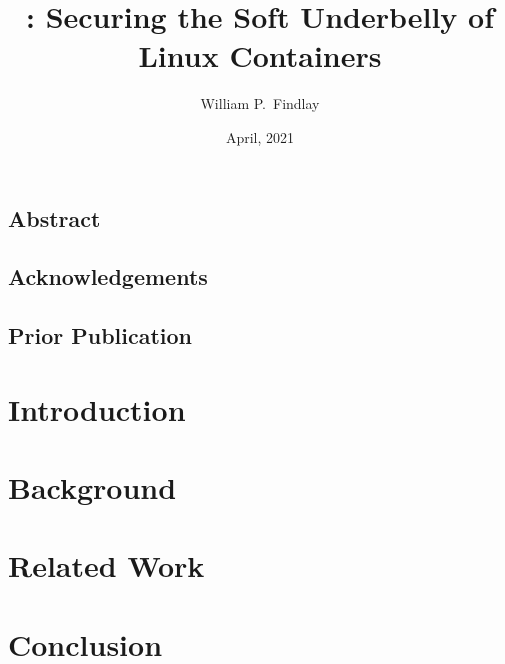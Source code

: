\documentclass[
  fontsize=12pt,
  paper=letter,
  twoside,
  cleardoublepage=plain,
]{scrbook}
\title{\bpfcontain\@: Securing the Soft Underbelly of Linux Containers}
\author{William P.~Findlay}
\date{April, 2021}
\begin{document}



\frontmatter%

\section*{Abstract}
\cleardoublepage%

\section*{Acknowledgements}
\cleardoublepage%

\section*{Prior Publication}
\cleardoublepage%

\begingroup
\hypersetup{linkcolor=black}
\tableofcontents
\listoffigures
\listoftables
\endgroup

\mainmatter%


\chapter{Introduction}%
\label{c:introduction}


\chapter{Background}%
\label{c:background}


\chapter{Related Work}%
\label{c:related}


\chapter{Conclusion}%
\label{c:conclusion}

\end{document}
